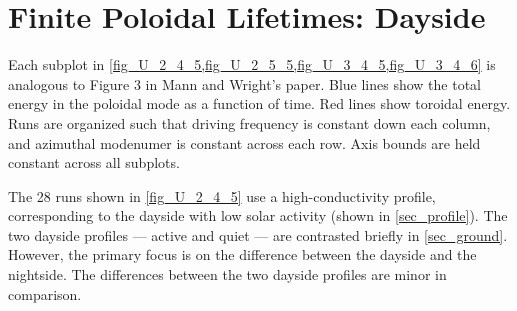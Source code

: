 






\section{Finite Poloidal Lifetimes: Dayside}
  \label{sec_lifetimes_day}

Each subplot in \cref{fig_U_2_4_5,fig_U_2_5_5,fig_U_3_4_5,fig_U_3_4_6} is analogous to Figure 3 in Mann and Wright's paper\cite{mann_1995}. Blue lines show the total energy in the poloidal mode as a function of time. Red lines show toroidal energy. Runs are organized such that driving frequency is constant down each column, and azimuthal modenumer is constant across each row. Axis bounds are held constant across all subplots. 

The 28 runs shown in \cref{fig_U_2_4_5} use a high-conductivity profile, corresponding to the dayside with low solar activity (shown in \cref{sec_profile}). The two dayside profiles --- active and quiet --- are contrasted briefly in \cref{sec_ground}. However, the primary focus is on the difference between the dayside and the nightside. The differences between the two dayside profiles are minor in comparison. 

